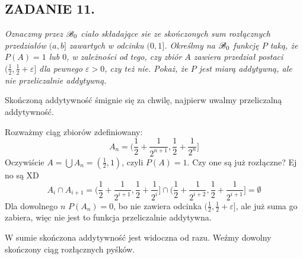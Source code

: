 \documentclass{article}
\begin{document}
\subsection*{ZADANIE 11.}
\emph{Oznaczmy przez $\mathcal{B}_0$ ciało składające sie ze skończonych sum rozłącznych przedziałów $(a, b]$ zawartych w odcinku $(0,1]$. Określmy na $\mathcal{B}_0$ funkcję $P$ taką, że $P(A)=1$ lub $0$, w zależności od tego, czy zbiór $A$ zawiera przedział postaci $(\frac12,\frac12+\varepsilon]$ dla pewnego $\varepsilon>0$, czy też nie. Pokaż, że $P$ jest miarą addytywną, ale nie przeliczalnie addytywną.}
\smallskip

Skończoną addytywność śmignie się za chwilę, najpierw uwalmy przeliczalną addytywność.

Rozważmy ciąg zbiorów zdefiniowany:
$$A_n=(\frac12+\frac1{2^{n+1}}, \frac12+\frac1{2^{n}}]$$
Oczywiście $A=\bigcup A_n=(\frac12, 1)$, czyli $P(A)=1$. Czy one są już rozłączne? Ej no są XD
$$A_i\cap A_{i+1}=(\frac12+\frac1{2^{i+1}}, \frac12+\frac1{2^i}]\cap(\frac12+\frac1{2^{i+2}},\frac12+\frac1{2^{i+1}}]=\emptyset$$
Dla dowolnego $n$ $P(A_n)=0$, bo nie zawiera odcinka $(\frac12, \frac12+\varepsilon]$, ale już suma go zabiera, więc nie jest to funkcja przeliczalnie addytywna.

W sumie skończona addytywność jest widoczna od razu. Weźmy dowolny skończony ciąg rozłącznych pyśków.
\end{document}
